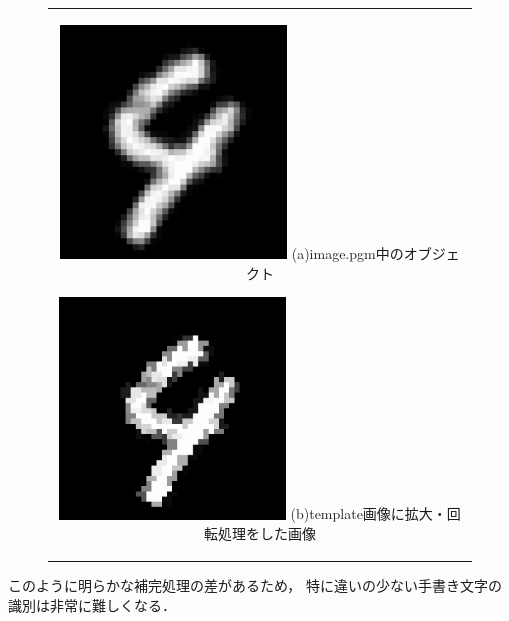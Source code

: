\documentclass[uplatex,dvipdfmx]{jsarticle}
\begin{document}
\begin{figure}[htbp]
\begin{center}
  \begin{tabular}{c}

    \begin{minipage}{0.5\hsize}
      \begin{center}
        \includegraphics[clip, width=60mm]{images/naoko.png}
        \hspace{1.6cm} (a)image.pgm中のオブジェクト
      \end{center}
    \end{minipage}

    \begin{minipage}{0.5\hsize}
      \begin{center}
        \includegraphics[clip, width=60mm]{images/trimming.png}
        \hspace{1.6cm} (b)template画像に拡大・回転処理をした画像
      \end{center}
    \end{minipage}

  \end{tabular}
  \caption{}
  \label{fig:img}
  \end{center}
\end{figure}

このように明らかな補完処理の差があるため，
特に違いの少ない手書き文字の識別は非常に難しくなる．
\end{document}
